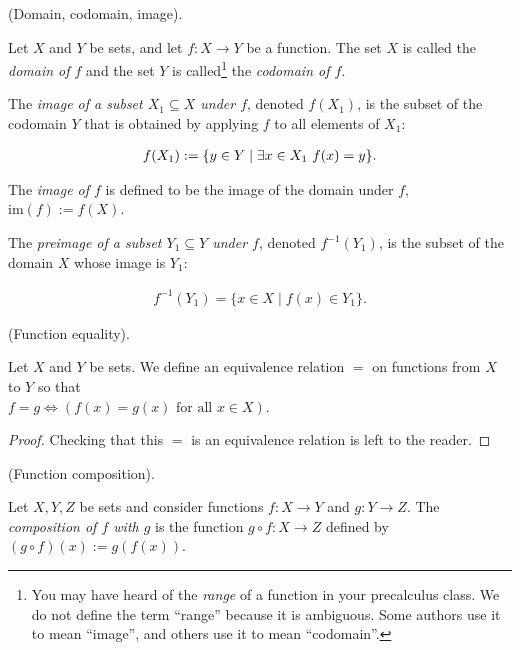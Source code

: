 \begin{defn}
    (Domain, codomain, image).

    Let $X$ and $Y$ be sets, and let $f:X \rightarrow Y$ be a function. The set $X$ is called the \textit{domain of $f$} and the set $Y$ is called\footnote{You may have heard of the \textit{range} of a function in your precalculus class. We do not define the term ``range'' because it is ambiguous. Some authors use it to mean ``image'', and others use it to mean ``codomain''.} the \textit{codomain of $f$}.
    
    The \textit{image of a subset $X_1 \subseteq X$ under $f$}, denoted $f(X_1)$, is the subset of the codomain $Y$ that is obtained by applying $f$ to all elements of $X_1$:

    \begin{align*}
        f(X_1) := \{ y \in Y \mid \exists x \in X_1 \text{ } f(x) = y\}.
    \end{align*}

    The \textit{image of $f$} is defined to be the image of the domain under $f$, $\text{im}(f) := f(X)$.

    The \textit{preimage of a subset $Y_1 \subseteq Y$ under $f$}, denoted $f^{-1}(Y_1)$, is the subset of the domain $X$ whose image is $Y_1$:

    \begin{align*}
        f^{-1}(Y_1) = \{ x \in X \mid f(x) \in Y_1 \}.
    \end{align*}
\end{defn}

\begin{defn}
    (Function equality).

    Let $X$ and $Y$ be sets. We define an equivalence relation $=$ on functions from $X$ to $Y$ so that \\ ${f = g \iff (f(x) = g(x) \text{ for all $x \in X$})}$.
\end{defn}

\begin{proof}
    Checking that this $=$ is an equivalence relation is left to the reader.
\end{proof}

\begin{defn}
    (Function composition).

    Let $X, Y, Z$ be sets and consider functions $f:X \rightarrow Y$ and $g:Y \rightarrow Z$. The \textit{composition of $f$ with $g$} is the function $g \circ f:X \rightarrow Z$ defined by $(g \circ f)(x) := g(f(x))$.
\end{defn}

